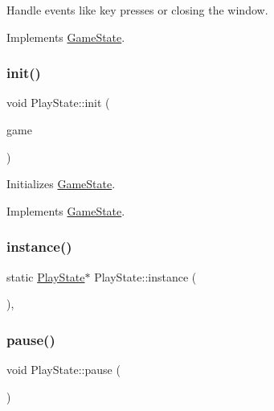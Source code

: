 Handle events like key presses or closing the window. 



Implements \mbox{\hyperlink{class_game_state_a3ef0638514dbfe71581d593cf0f66ce5}{Game\+State}}.

\mbox{\label{class_play_state_ae5761f09579d0f1800253764f2d68218}} 
\subsubsection{\texorpdfstring{init()}{init()}}
{\footnotesize\ttfamily void Play\+State\+::init (\begin{DoxyParamCaption}\item[{\mbox{\hyperlink{class_game_engine}{Game\+Engine}} $\ast$}]{game }\end{DoxyParamCaption})\hspace{0.3cm}{\ttfamily [virtual]}}



Initializes \mbox{\hyperlink{class_game_state}{Game\+State}}. 



Implements \mbox{\hyperlink{class_game_state_a10b6e6bb31591c70d08ffcee5f29fa81}{Game\+State}}.

\mbox{\label{class_play_state_a6a46a82e229d66dae0c68244faa7ade3}} 
\subsubsection{\texorpdfstring{instance()}{instance()}}
{\footnotesize\ttfamily static \mbox{\hyperlink{class_play_state}{Play\+State}}$\ast$ Play\+State\+::instance (\begin{DoxyParamCaption}{ }\end{DoxyParamCaption})\hspace{0.3cm}{\ttfamily [inline]}, {\ttfamily [static]}}

\mbox{\label{class_play_state_a5c135eed71fd8dbf30b75e577c28ad0d}} 
\subsubsection{\texorpdfstring{pause()}{pause()}}
{\footnotesize\ttfamily void Play\+State\+::pause (\begin{DoxyParamCaption}{ }\end{DoxyParamCaption})\hspace{0.3cm}{\ttfamily [virtual]}}



